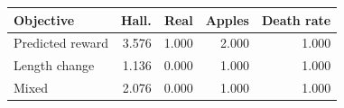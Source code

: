 \begin{tabular}{lrrrr}
\toprule
Objective & Hall. & Real & Apples & Death rate \\
\midrule
Predicted reward & 3.576 & 1.000 & 2.000 & 1.000 \\
Length change & 1.136 & 0.000 & 1.000 & 1.000 \\
Mixed & 2.076 & 0.000 & 1.000 & 1.000 \\
\bottomrule
\end{tabular}
